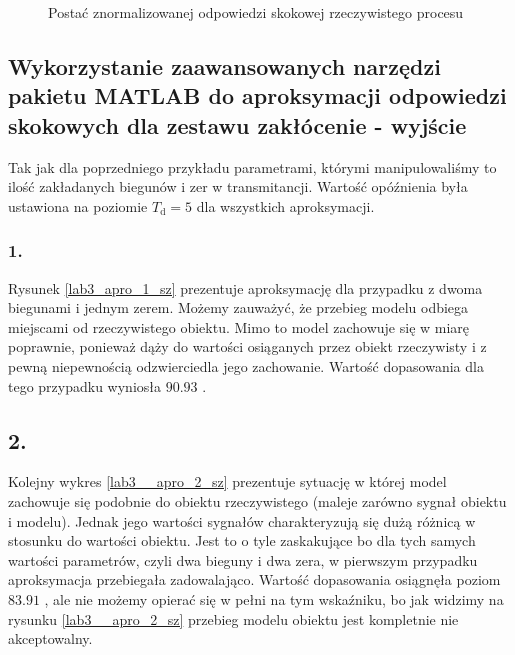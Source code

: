 \begin{figure}[b]
    \centering
    \caption{Postać znormalizowanej odpowiedzi skokowej rzeczywistego procesu}
    \label{lab3_odp_skok_sz}
\end{figure}
\FloatBarrier

\subsection{Wykorzystanie zaawansowanych narzędzi pakietu MATLAB do aproksymacji odpowiedzi skokowych dla zestawu zakłócenie - wyjście}
Tak jak dla poprzedniego przykładu parametrami, którymi manipulowaliśmy to ilość zakładanych biegunów i zer w transmitancji. Wartość opóźnienia była ustawiona na poziomie $T_{\mathrm{d}}=5$ dla wszystkich aproksymacji. 

\subsubsection{1.}
Rysunek \ref{lab3_apro_1_sz} prezentuje aproksymację dla przypadku z dwoma biegunami i jednym zerem. Możemy zauważyć, że przebieg modelu odbiega miejscami od rzeczywistego obiektu. Mimo to model zachowuje się w miarę poprawnie, ponieważ dąży do wartości osiąganych przez obiekt rzeczywisty i z pewną niepewnością odzwierciedla jego zachowanie. Wartość dopasowania dla tego przypadku wyniosła $\num{90,93}$ \text{\%}.

\subsection{2. }
Kolejny wykres \ref{lab3__apro_2_sz} prezentuje sytuację w której model zachowuje się podobnie do obiektu rzeczywistego (maleje zarówno sygnał obiektu i modelu). Jednak jego wartości sygnałów charakteryzują się dużą różnicą w stosunku do wartości obiektu. Jest to o tyle zaskakujące bo dla tych samych wartości parametrów, czyli dwa bieguny i dwa zera, w pierwszym przypadku aproksymacja przebiegała zadowalająco. Wartość dopasowania osiągnęła poziom $\num{83,91}$ \text{\%}, ale nie możemy opierać się w pełni na tym wskaźniku, bo jak widzimy na rysunku \ref{lab3__apro_2_sz} przebieg modelu obiektu jest kompletnie nie akceptowalny. 

